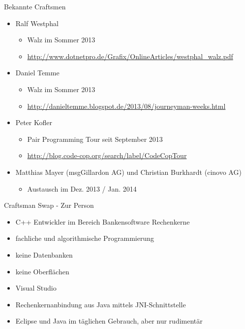 \begin{frame}{Bekannte Craftsmen}

\begin{itemize}
\item Ralf Westphal
\begin{itemize}
\item \glqq Walz\grqq{} im Sommer 2013
\item \url{http://www.dotnetpro.de/Grafix/OnlineArticles/westphal_walz.pdf}
\end{itemize}


\item Daniel Temme
\begin{itemize}
\item \glqq Walz\grqq{} im Sommer 2013
\item \url{http://danieltemme.blogspot.de/2013/08/journeyman-weeks.html}
\end{itemize}

\item Peter Kofler
\begin{itemize}
\item \glqq{}Pair Programming Tour\grqq{} seit September 2013
\item \url{http://blog.code-cop.org/search/label/CodeCopTour}
\end{itemize}

\item Matthias Mayer (msgGillardon AG) und Christian Burkhardt (cinovo AG)
\begin{itemize}
\item Austausch im Dez. 2013 / Jan. 2014
\end{itemize}


\end{itemize}

\end{frame}


\begin{frame}{Craftsman Swap - Zur Person}
 
 
\begin{itemize}
\item C++ Entwickler im Bereich Bankensoftware Rechenkerne
\item fachliche und algorithmische Programmierung
\item keine Datenbanken
\item keine Oberflächen
\item Visual Studio
\item Rechenkernanbindung aus Java mittels JNI-Schnittstelle
\item Eclipse und Java im täglichen Gebrauch, aber nur rudimentär
 
\end{itemize}
 
 
\end{frame}
 
